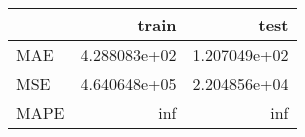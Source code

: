 \begin{tabular}{lrr}
\toprule
{} &         train &          test \\
\midrule
MAE  &  4.288083e+02 &  1.207049e+02 \\
MSE  &  4.640648e+05 &  2.204856e+04 \\
MAPE &           inf &           inf \\
\bottomrule
\end{tabular}
